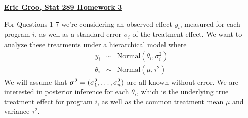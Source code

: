 \documentclass[12pt]{article}
\newcommand{\si}{\mbox{\boldmath $\sigma$}}
\begin{document}
\begin{center}
	{\large {\underline {\bf Eric Groo, Stat 289 Homework 3}}} 
\end{center}

\vspace{.2cm}

\vspace{.2cm} 
\noindent For Questions 1-7 we're considering an observed effect $y_i$, measured for each program $i$, as well as a standard error $\sigma_i$ of the treatment effect. We want to analyze these treatments under a hierarchical model where 
\begin{eqnarray*}
	y_i & \sim & \mbox{Normal}(\theta_i,\sigma^2_i)\\
	\theta_i & \sim & \mbox{Normal}(\mu,\tau^2) 
\end{eqnarray*}
We will assume that $\si^2=(\sigma^2_1,\ldots,\sigma^2_n)$ are all known without error. We are interested in posterior inference for each $\theta_i$, which is the underlying true treatment effect for program $i$, as well as the common treatment mean $\mu$ and variance $\tau^2$.
\end{document}

